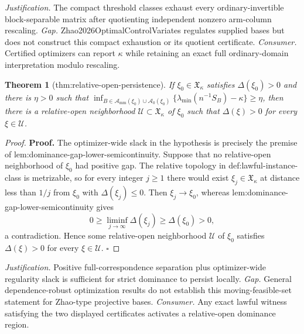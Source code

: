 \documentclass{article}
\newtheorem{theorem}{Theorem}
\begin{document}
\par\smallskip\noindent \textit{Justification.} The compact threshold classes exhaust every ordinary-invertible block-separable matrix after quotienting independent nonzero arm-column rescaling. \textit{Gap.} Zhao2026OptimalControlVariates regulates supplied bases but does not construct this compact exhaustion or its quotient certificate. \textit{Consumer.} Certified optimizers can report \(\kappa\) while retaining an exact full ordinary-domain interpretation modulo rescaling.

\begin{theorem}[thm:relative-open-persistence]\label{thm:relative-open-persistence}
If \(\xi_0\in\mathfrak X_\kappa\) satisfies \(\Delta(\xi_0)>0\) and there is \(\eta>0\) such that \(\inf_{B\in\mathcal A_{\mathrm{mm}}(\xi_0)\cup\mathcal A_0(\xi_0)}\{\lambda_{\min}(n^{-1}S_B)-\kappa\}\ge\eta\), then there is a relative-open neighborhood \(\mathcal U\subset\mathfrak X_\kappa\) of \(\xi_0\) such that \(\Delta(\xi)>0\) for every \(\xi\in\mathcal U\).
\end{theorem}
\begin{proof}
\textbf{Proof.}
The optimizer-wide slack in the hypothesis is precisely the premise of lem:dominance-gap-lower-semicontinuity.  Suppose that no relative-open neighborhood of \(\xi_0\) had positive gap.  The relative topology in def:lawful-instance-class is metrizable, so for every integer \(j\ge1\) there would exist \(\xi_j\in\mathfrak X_\kappa\) at distance less than \(1/j\) from \(\xi_0\) with \(\Delta(\xi_j)\le0\).  Then \(\xi_j\to\xi_0\), whereas lem:dominance-gap-lower-semicontinuity gives
\[
0\ge\liminf_{j\to\infty}\Delta(\xi_j)
\ge\Delta(\xi_0)>0,
\]
a contradiction.  Hence some relative-open neighborhood \(\mathcal U\) of \(\xi_0\) satisfies \(\Delta(\xi)>0\) for every \(\xi\in\mathcal U\).  \(\square\)
\end{proof}
\par\smallskip\noindent \textit{Justification.} Positive full-correspondence separation plus optimizer-wide regularity slack is sufficient for strict dominance to persist locally. \textit{Gap.} General dependence-robust optimization results do not establish this moving-feasible-set statement for Zhao-type projective bases. \textit{Consumer.} Any exact lawful witness satisfying the two displayed certificates activates a relative-open dominance region.
\end{document}
